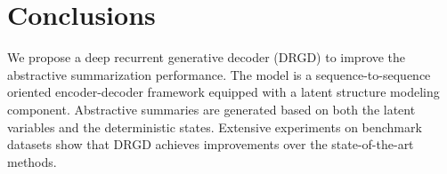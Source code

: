 \documentclass[11pt,letterpaper]{article}
\begin{document}
\section{Conclusions}
We propose a deep recurrent generative decoder (DRGD) to improve the abstractive summarization performance.
The model is a sequence-to-sequence oriented encoder-decoder framework equipped with a latent structure modeling component. 
Abstractive summaries are generated based on both the latent variables and the deterministic states. 
Extensive experiments on benchmark datasets show that DRGD achieves improvements over the state-of-the-art methods.



\end{document}
